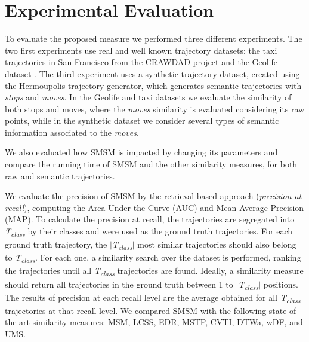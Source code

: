%



\chapter[Experiments]{Experimental Evaluation}\label{sec:experiments}

\begin{flushright}
     
\end{flushright}

To evaluate the proposed measure we performed three different experiments. The two first experiments use real and well known trajectory datasets: the taxi trajectories in San Francisco from the CRAWDAD project \cite{epfl-mobility-20090224} and the Geolife dataset \cite{zheng2009mining}. The third experiment uses a synthetic trajectory dataset, created using the Hermoupolis \cite{Pelekis-Hermoupolis} trajectory generator, which generates semantic trajectories with \emph{stops} and \emph{moves}. In the Geolife and taxi datasets we evaluate the similarity of both stops and moves, where the \emph{moves} similarity is evaluated considering its raw points, while in the synthetic dataset we consider several types of semantic information associated to the \emph{moves}. 

We also evaluated how SMSM is impacted by changing its parameters and compare the running time of SMSM and the other similarity measures, for both raw and semantic trajectories.

We evaluate the precision of SMSM by the retrieval-based approach (\textit{precision at recall}), computing the Area Under the Curve (AUC) and Mean Average Precision (MAP). To calculate the precision at recall, the trajectories are segregated into \textit{T\textsubscript{class}} by their classes and were used as the ground truth trajectories. For each ground truth trajectory, the $|$\textit{T\textsubscript{class}}$|$ most similar trajectories should also belong to \textit{T\textsubscript{class}}. For each one, a similarity search over the dataset is performed, ranking the trajectories until all \textit{T\textsubscript{class}} trajectories are found. Ideally, a similarity measure should return all trajectories in the ground truth between 1 to $|$\textit{T\textsubscript{class}}$|$ positions. The results of precision at each recall level are the average obtained for all \textit{T\textsubscript{class}} trajectories at that recall level. We compared SMSM with the following state-of-the-art similarity measures: MSM, LCSS, EDR, MSTP, CVTI, DTWa, wDF, and UMS.

